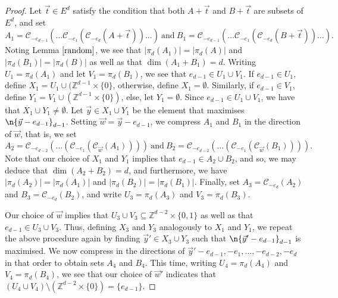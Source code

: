 \begin{proof} 
Let $\vec{t} \in E^d$ satisfy the condition that both $A + \vec{t}$ and $B+ \vec{t}$ are subsets of $E^d$, and set
\[ A_ 1= \mathcal{C}_{-e_{d-1}} ( \dots \mathcal{C}_{-e_1}(\mathcal{C}_{-e_d}(A+ \vec{t}))\dots) \ \text{and} \ B_1= \mathcal{C}_{-e_{d-1}}( \dots \mathcal{C}_{-e_1}(\mathcal{C}_{-e_d}(B+ \vec{t}))\dots). \]
Noting Lemma $\ref{random}$, we see that $|\pi_d(A_1)| = |\pi_d(A)|$ and $|\pi_d(B_1)| = |\pi_d(B)|$ as well as that $\dim(A_1 + B_1) = d$. Writing $U_1 = \pi_d(A_1)$ and let $V_1 = \pi_d(B_1)$, we see that $e_{d-1} \in U_1 \cup V_1$. If $e_{d-1} \in U_1$, define $X_1 = U_1 \cup (\mathbb{Z}^{d-1} \times \{0\}$, otherwise, define $X_1 = \emptyset$. Similarly, if $e_{d-1} \in V_1$, define $Y_1 = V_1 \cup (\mathbb{Z}^{d-1} \times \{0\})$, else, let $Y_1 = \emptyset$. Since $e_{d-1} \in U_1 \cup V_1$, we have that $X_1 \cup Y_1 \neq \emptyset$. Let $\vec{y} \in X_1 \cup Y_1$ be the element that maximises $\n{\vec{y} - e_{d-1}}_{d-1}$. Setting $\vec{w} = \vec{y} - e_{d-1}$, we compress $A_1$ and $B_1$ in the direction of $\vec{w}$, that is, we set 
\[A_2 = \mathcal{C}_{-e_{d-2}} ( \dots (\mathcal{C}_{-e_1}(\mathcal{C}_{\vec{w}}(A_1)))) \ \text{and} \ B_2 = \mathcal{C}_{-e_{d-2}} ( \dots (\mathcal{C}_{-e_1}(\mathcal{C}_{\vec{w}}(B_1)))). \]
Note that our choice of $X_1$ and $Y_1$ implies that $e_{d-1} \in A_2 \cup B_2$, and so, we may deduce that $\dim(A_2 + B_2) = d$, and furthermore, we have $|\pi_d(A_2)| = |\pi_d(A_1)|$ and $|\pi_d(B_2)| = |\pi_d(B_1)|$. Finally, set $A_3 = \mathcal{C}_{-e_d}(A_2)$ and $B_3 =\mathcal{C}_{-e_d}(B_2)$, and write $U_3 = \pi_d(A_3)$ and $V_3 = \pi_d(B_3)$.
%
 \par
 
Our choice of $\vec{w}$ implies that $U_3 \cup V_3  \subseteq \mathbb{Z}^{d-2} \times \{0,1\}$ as well as that $e_{d-1} \in U_3 \cup V_3$. Thus, defining $X_3$ and $Y_3$ analogously to $X_1$ and $Y_1$, we repeat the above procedure again by finding $\vec{y}' \in X_3 \cup Y_3$ such that $\n{\vec{y}' - e_{d-1}}_{d-1}$ is maximised. We now compress in the directions of $\vec{y}' - e_{d-1}, - e_1, \dots, -e_{d-2}, -e_d$ in that order to obtain sets $A_4$ and $B_4$. This time, writing $U_4 =\pi_{d}(A_4)$ and $V_4 = \pi_{d}(B_4)$, we see that our choice of $\vec{w}'$ indicates that $(U_4 \cup V_4) \setminus (\mathbb{Z}^{d-2} \times \{0\}) = \{e_{d-1}\}$.
\par


\end{proof}
